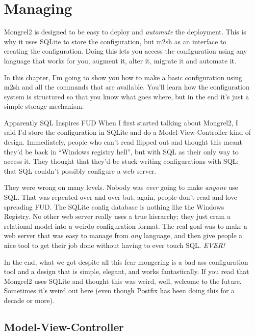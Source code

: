 \chapter{Managing}

Mongrel2 is designed to be easy to deploy and \emph{automate} the deployment.
This is why it uses \href{http://www.sqlite.org/}{SQLite} to store the configuration,
but m2sh as an interface to creating the configuration.  Doing this lets
you access the configuration using any language that works for you, augment it,
alter it, migrate it and automate it.

In this chapter, I'm going to show you how to make a basic configuration using
m2sh and all the commands that are available.  You'll learn how the configuration
system is structured so that you know what goes where, but in the end it's just
a simple storage mechanism.

\begin{aside}{Apparently SQL Inspires FUD}
When I first started talking about Mongrel2, I said I'd store the configuration
in SQLite and do a Model-View-Controller kind of design.  Immediately, people who
can't read flipped out and thought this meant they'd be back in ``Windows registry hell'',
but with SQL as their only way to access it.  They thought that they'd be stuck writing
configurations with SQL; that SQL couldn't possibly configure a web server.

They were wrong on many levels.  Nobody was \emph{ever} going to make \emph{anyone} use
SQL\@.  That was repeated over and over but, again, people don't read and love spreading
FUD\@.  The SQLite config database is nothing like the Windows Registry.  No other web
server really uses a true hierarchy; they just cram a relational model into a weirdo
configuration format.  The real goal was to make a web server that was easy to manage from
\emph{any} language, and then give people a nice tool to get their job done without
having to ever touch SQL\@.  \emph{EVER!}

In the end, what we got despite all this fear mongering is a bad ass configuration
tool and a design that is simple, elegant, and works fantastically.  If you read that
Mongrel2 uses SQLite and thought this was weird, well, welcome to the future.  Sometimes
it's weird out here (even though Postfix has been doing this for a decade or more).
\end{aside}


\section{Model-View-Controller}

